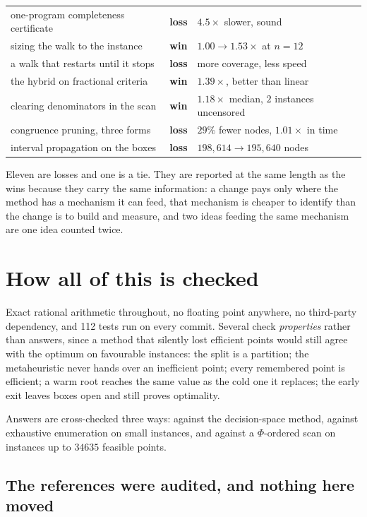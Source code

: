\documentclass[11pt,a4paper]{article}
\begin{document}
\begin{table}[h]
\begin{tabular}{lll}
one-program completeness certificate  & \textbf{loss} & $4.5\times$ slower, sound \\
sizing the walk to the instance       & \textbf{win}  & $1.00 \to 1.53\times$ at $n=12$ \\
a walk that restarts until it stops   & \textbf{loss} & more coverage, less speed \\
the hybrid on fractional criteria     & \textbf{win}  & $1.39\times$, better than linear \\
clearing denominators in the scan     & \textbf{win}  & $1.18\times$ median, $2$ instances uncensored \\
congruence pruning, three forms       & \textbf{loss} & $29\%$ fewer nodes, $1.01\times$ in time \\
interval propagation on the boxes     & \textbf{loss} & $198{,}614 \to 195{,}640$ nodes \\
\bottomrule
\end{tabular}
\end{table}

\noindent
Eleven are losses and one is a tie.  They are reported at the same length as the
wins because they carry the same information: a change pays only where the
method has a mechanism it can feed, that mechanism is cheaper to identify than
the change is to build and measure, and two ideas feeding the same mechanism
are one idea counted twice.

\section{How all of this is checked}

Exact rational arithmetic throughout, no floating point anywhere, no
third-party dependency, and 112 tests run on every commit.  Several check
\emph{properties} rather than answers, since a method that silently lost
efficient points would still agree with the optimum on favourable instances:
the split is a partition; the metaheuristic never hands over an inefficient
point; every remembered point is efficient; a warm root reaches the same value
as the cold one it replaces; the early exit leaves boxes open and still proves
optimality.

Answers are cross-checked three ways: against the decision-space method,
against exhaustive enumeration on small instances, and against a
$\Phi$-ordered scan on instances up to $34635$ feasible points.

\subsection{The references were audited, and nothing here moved}
\end{document}

